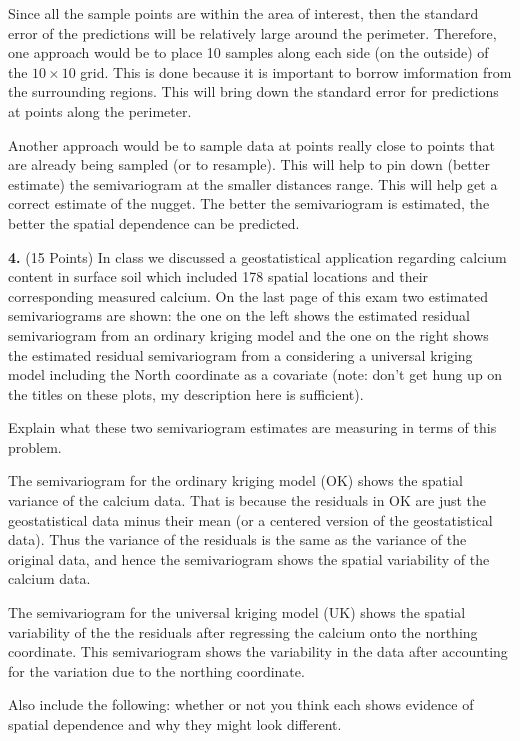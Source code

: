 \documentclass[letterpaper, 12pt]{article}
\begin{document}
{\sf
Since all the sample points are within the area of interest, then the standard error of the predictions will be relatively large around the perimeter. Therefore, one approach would be to place 10 samples along each side (on the outside) of the $10 \times 10$ grid. This is done because it is important to borrow imformation from the surrounding regions. This will bring down the standard error for predictions at points along the perimeter.

Another approach would be to sample data at points really close to points that are already being sampled (or to resample). This will help to pin down (better estimate) the semivariogram at the smaller distances range. This will help get a correct estimate of the nugget. The better the semivariogram is estimated, the better the spatial dependence can be predicted.
}

\textbf{4.} (15 Points)
In class we discussed a geostatistical application regarding calcium content in surface soil which included 178 spatial locations and their corresponding measured calcium. On the last page of this exam two estimated semivariograms are shown: the one on the left shows the estimated residual semivariogram from an ordinary kriging model and the one on the right shows the estimated residual semivariogram from a considering a universal kriging model including the North coordinate as a covariate (note: don’t get hung up on the titles on these plots, my description here is sufficient). 

Explain what these two semivariogram estimates are measuring in terms of this problem. 

{\sf
The semivariogram for the ordinary kriging model (OK) shows the spatial variance of the calcium data. That is because the residuals in OK are just the geostatistical data minus their mean (or a centered version of the geostatistical data). Thus the variance of the residuals is the same as the variance of the original data, and hence the semivariogram shows the spatial variability of the calcium data.

The semivariogram for the universal kriging model (UK) shows the spatial variability of the the residuals after regressing the calcium onto the northing coordinate. This semivariogram shows the variability in the data after accounting for the variation due to the northing coordinate.
}

Also include the following: whether or not you think each shows evidence of spatial dependence and why they might look different. 
\end{document}
